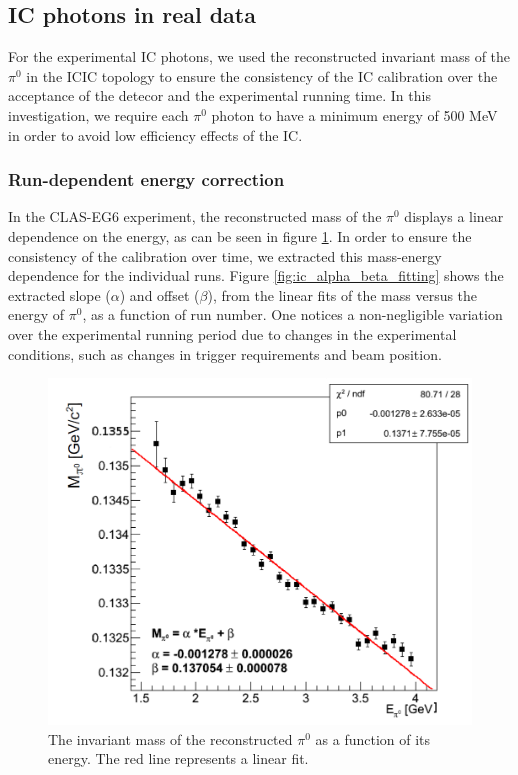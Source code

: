 \subsection{IC photons in real data} 
For the experimental IC photons, we 
used the reconstructed invariant mass of the $\pi^{0}$ in the ICIC topology to 
ensure the consistency of the IC calibration over the acceptance of the detecor 
and the experimental running time. In this investigation, we require each 
$\pi^{0}$ photon to have a minimum energy of 500 MeV in order to avoid low 
efficiency effects of the IC. 

\subsubsection{Run-dependent energy correction}

In the CLAS-EG6 experiment, the reconstructed mass of the $\pi^{0}$ displays a linear dependence on the energy, as can be seen in figure \ref{fig:M_E_pi0_before_corrections}. In order to ensure the consistency of the calibration over time, we extracted this mass-energy dependence for the individual runs. Figure \ref{fig:ic_alpha_beta_fitting} shows the extracted slope ($\alpha$) and offset ($\beta$), from the linear fits of the mass versus the energy of $\pi^{0}$, as a function of run number. One notices a non-negligible variation over the experimental running period due to changes in the experimental conditions, such as changes in trigger requirements and beam position.

\begin{figure}[tbp]
\centering
\includegraphics[scale=0.25]{fig_simulation/M_E_pi0_before_corrections.png}
\caption{The invariant mass of the reconstructed $\pi^{0}$ as a function of its energy. The red line represents a linear fit.} 
\label{fig:M_E_pi0_before_corrections}
\end{figure}

